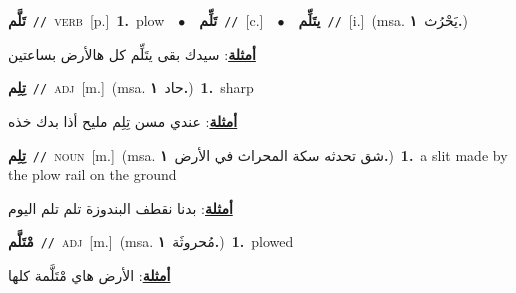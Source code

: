 \documentclass[10pt,a4paper,twoside]{article} %
\begin{document}
\begin{multicols}{2}
{\setlength\topsep{0pt}\textbf{\foreignlanguage{arabic}{تَلَّم}}\ {\color{gray}\texttt{//}\color{black}}\ \textsc{verb}\ [p.]\ \textbf{1.}~plow\ \ $\bullet$\ \ \setlength\topsep{0pt}\textbf{\foreignlanguage{arabic}{تَلِّم}}\ {\color{gray}\texttt{//}\color{black}}\ [c.]\ \ $\bullet$\ \ \setlength\topsep{0pt}\textbf{\foreignlanguage{arabic}{يتَلِّم}}\ {\color{gray}\texttt{//}\color{black}}\ [i.]\ \color{gray}(msa. \foreignlanguage{arabic}{يَحْرُث}~\foreignlanguage{arabic}{\textbf{١.}})\color{black}\  \begin{flushright}\color{gray}\foreignlanguage{arabic}{\textbf{\underline{\foreignlanguage{arabic}{أمثلة}}}: سيدك بقى يتَلِّم كل هالأرض بساعتين}\end{flushright}\color{black}} \vspace{2mm}

{\setlength\topsep{0pt}\textbf{\foreignlanguage{arabic}{تِلِم}}\ {\color{gray}\texttt{//}\color{black}}\ \textsc{adj}\ [m.]\ \color{gray}(msa. \foreignlanguage{arabic}{حاد}~\foreignlanguage{arabic}{\textbf{١.}})\color{black}\ \textbf{1.}~sharp\  \begin{flushright}\color{gray}\foreignlanguage{arabic}{\textbf{\underline{\foreignlanguage{arabic}{أمثلة}}}: عندي مسن تِلِم مليح أذا بدك خذه}\end{flushright}\color{black}} \vspace{2mm}

{\setlength\topsep{0pt}\textbf{\foreignlanguage{arabic}{تِلِم}}\ {\color{gray}\texttt{//}\color{black}}\ \textsc{noun}\ [m.]\ \color{gray}(msa. \foreignlanguage{arabic}{شق تحدثه سكة المحراث في الأرض}~\foreignlanguage{arabic}{\textbf{١.}})\color{black}\ \textbf{1.}~a slit made by the plow rail on the ground\  \begin{flushright}\color{gray}\foreignlanguage{arabic}{\textbf{\underline{\foreignlanguage{arabic}{أمثلة}}}: بدنا نقطف البندوزة تلم تلم اليوم}\end{flushright}\color{black}} \vspace{2mm}

{\setlength\topsep{0pt}\textbf{\foreignlanguage{arabic}{مْتَلَّم}}\ {\color{gray}\texttt{//}\color{black}}\ \textsc{adj}\ [m.]\ \color{gray}(msa. \foreignlanguage{arabic}{مُحروثَة}~\foreignlanguage{arabic}{\textbf{١.}})\color{black}\ \textbf{1.}~plowed\  \begin{flushright}\color{gray}\foreignlanguage{arabic}{\textbf{\underline{\foreignlanguage{arabic}{أمثلة}}}: الأرض هاي مْتَلَّمة كلها}\end{flushright}\color{black}} \vspace{2mm}


\end{multicols}
\end{document}
